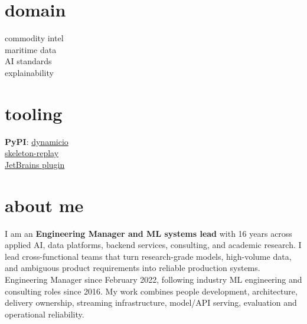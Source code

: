 \documentclass[]{friggeri-cv}
\begin{document}
\begin{aside}
    \section{domain}
        {\footnotesize commodity intel\\maritime data\\AI standards\\explainability}
    \section{tooling}
        {\footnotesize \textbf{PyPI}: \href{https://pypi.org/project/dynamicio/}{dynamicio}\\\href{https://pypi.org/project/skeleton-replay/}{skeleton-replay}\\\href{https://plugins.jetbrains.com/plugin/32807-skeleton-replay}{JetBrains plugin}}
\end{aside}

\section{about me}
{\normalsize I am an \textbf{Engineering Manager and ML systems lead} with 16 years across applied AI, data platforms, backend services, consulting, and academic research. I lead cross-functional teams that turn research-grade models, high-volume data, and ambiguous product requirements into reliable production systems. Engineering Manager since February 2022, following industry ML engineering and consulting roles since 2016. My work combines people development, architecture, delivery ownership, streaming infrastructure, model/API serving, evaluation and operational reliability.}
\end{document}
